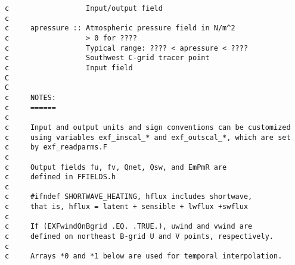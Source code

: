 {\begin{verbatim}
c                  Input/output field
c
c     apressure :: Atmospheric pressure field in N/m^2
c                  > 0 for ????
c                  Typical range: ???? < apressure < ????
c                  Southwest C-grid tracer point
c                  Input field
C
C
c     NOTES:
c     ======
c
c     Input and output units and sign conventions can be customized
c     using variables exf_inscal_* and exf_outscal_*, which are set
c     by exf_readparms.F
c
c     Output fields fu, fv, Qnet, Qsw, and EmPmR are
c     defined in FFIELDS.h
c
c     #ifndef SHORTWAVE_HEATING, hflux includes shortwave,
c     that is, hflux = latent + sensible + lwflux +swflux
c
c     If (EXFwindOnBgrid .EQ. .TRUE.), uwind and vwind are
c     defined on northeast B-grid U and V points, respectively.
c
c     Arrays *0 and *1 below are used for temporal interpolation.
\end{verbatim}
}

